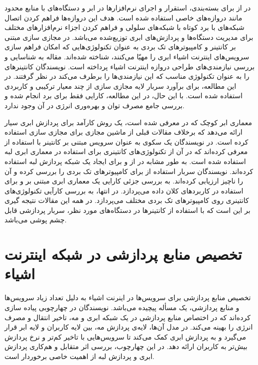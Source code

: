     در \cite{novo2015capillary} از  برای بسته‌بندی، استقرار و اجرای نرم‌افزار‌ها در ابر و دستگاه‌های با منابع محدود مانند دروازه‌های خاصی استفاده شده است.
    هدف این دروازه‌ها فراهم کردن اتصال شبکه‌های با برد کوتاه با شبکه‌های سلولی و فراهم کردن اجزاء نرم‌افزار‌های مختلف برای مدیریت دستگاه‌ها و پردازش‌های ابری توزیع‌شده می‌باشد.
    در \cite{celesti2016exploring} مجازی سازی مبتنی بر کانتینر و کامپیوتر‌های تک بردی به عنوان تکنولوژی‌هایی که امکان فراهم سازی سرویس‌های اینترنت اشیاء ابری را مهیّا می‌کنند، شناخته شده‌اند.
    مقاله \cite{krylovskiy2015internet} به شناسایی و بررسی نیازمندی‌های طراحی دروازه اینترنت اشیاء پرداخته است.
    نویسندگان کانتینر‌های  را به عنوان تکنولوژی مناسب که این نیازمندی‌ها را برطرف می‌کند در نظر گرفتند.
    در این مطالعه، برای برآورد سربار لایه مجازی سازی از چند معیار ترکیبی و کاربردی استفاده شده است.
    با این حال، در این مطالعه، کارایی فقط برای برد  انجام شده و بررسی جامع مصرف توان و بهره‌وری انرژی در آن وجود ندارد.

    معماری ابر کوچک که در \cite{satyanarayanan2009case} معرفی شده است، یک روش کارآمد برای پردازش ابری سیار ارائه می‌دهد که برخلاف مقالات قبلی از ماشین مجازی برای مجازی سازی استفاده کرده است.
    در \cite{pahl2016container} نویسندگان یک سکوی به عنوان سرویس مبتنی بر کانتینر با استفاده از  معرفی کرده‌اند که در آن از تکنولوژی‌های کانتینری برای استفاده در معماری ابری لبه استفاده شده است.
    به طور مشابه در \cite{bellavista2017feasibility} از  و  برای ایجاد یک شبکه پردازش لبه استفاده کرده‌اند.
    نویسندگان سربار استفاده از  برای کامپیوتر‌های تک بردی را بررسی کرده و آن را ناچیز ارزیابی کرده‌اند.
    \cite{hajji2016understanding} به بررسی جزئی کارایی یک معماری ابری مبتنی بر  و  برای استفاده در کاربرد‌های کلان داده می‌پردازد.
    در انتها، \cite{morabito2017virtualization} به بررسی کارآیی تکنولوژی‌های کانتینری روی کامپیوتر‌های تک بردی مختلف می‌پردازد.
    در همه این مقالات نتیجه گیری بر این است که با استفاده از کانتینر‌ها در دستگاه‌های مورد نظر، سربار پردازشی قابل چشم پوشی می‌باشد.

  \section{تخصیص منابع پردازشی در شبکه اینترنت اشیاء}
    تخصیص منابع پردازشی برای سرویس‌ها در اینرنت اشیاء به دلیل تعداد زیاد سرویس‌ها و منابع پردازشی، یک مسأله پیچیده می‌باشد.
    نویسندگان در \cite{deng2016optimal} چهارچوبی پیاده سازی کرده‌اند که در اختصاص منابع پردازشی در یک شبکه ابری و مه، تاخیر انتقال و مصرف انرژی را بهینه می‌کند.
    در مدل آن‌ها، لایه‌ی پردازش مه، بین لایه کاربران و لایه‌ ابر قرار می‌گیرد و به پردازش ابری کمک می‌کند تا سرویس‌هایی با تاخیر کم‌تر و نرخ پردازش بیش‌تر به کاربران ارائه دهد.
    در این چهارچوب، بررسی اثر متقابل و هم‌کاری پردازش ابری و پردازش لبه از اهمیت خاصی برخوردار است.
    

